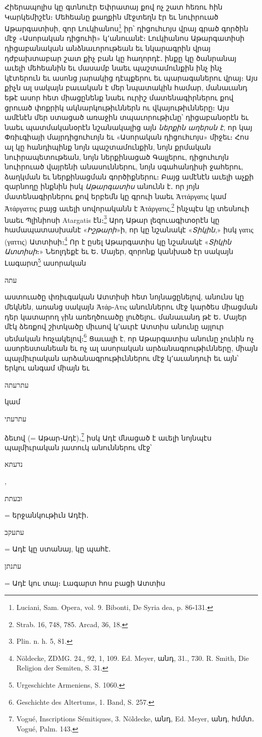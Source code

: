 \documentclass{article}
\begin{document}
{Հիերապոլիս կը գտնուէր Եփրատայ քով ոչ շատ հեռու հին Կարկեմիշէն։ Մեհեանը քաղքին մէջտեղն էր եւ նուիրուած Աթարգատիսի, զոր Լուկիանոս\footnote{Luciani, Sam. Opera, vol. 9. Bibonti, De Syria dea, p. 86֊131.} իր՝ դիցուհւոյս վրայ գրած գործին մէջ «Ասորական դիցուհի» կ՚անուանէ։ Լուկիանոս Աթարգատիսի դիցաբանական անձնաւորութեան եւ նկարագրին վրայ դժբախտաբար շատ քիչ բան կը հաղորդէ․ ինքը կը ծանրանայ աւելի մեհեանին եւ մասամբ նաեւ պաշտամունքին ինչ ինչ կէտերուն եւ ասոնց յարակից դէպքերու եւ պարագաներու վրայ։ Այս քիչն ալ սակայն բաւական է մեր նպատակին համար, մանաւանդ եթէ ասոր հետ միացընենք նաեւ ուրիշ մատենագիրներու քով ցրուած փոքրիկ ակնարկութիւններն ու վկայութիւնները։ Այս ամէնէն մեր ստացած առաջին տպաւորութիւնը՝ դիցաբանօրէն եւ նաեւ պատմականօրէն նշանակալից այն \emph{ներքին աղերսն է}, որ կայ Փռիւգիայի մայրդիցուհւոյն եւ «Ասորական դիցուհւոյս» միջեւ։ Հոս ալ կը հանդիպինք նոյն պաշտամունքին, նոյն քրմական նուիրապետութեան, նոյն ներքինացած Գալլերու, դիցուհւոյն նուիրուած վայրենի անասուններու, նոյն սգահանդիսի ջահերու, ձաղկման եւ ներքինացման գործիքներու։ Բայց ամէնէն աւելի աչքի զարնողը ինքնին իսկ \emph{Աթարգատիս} անունն է․ որ յոյն մատենագիրներու քով երբեմն կը գրուի նաեւ Ἀττάργατις կամ Ἀτάργαττις բայց աւելի սովորականն է Ἀτάργατις,\footnote{Strab. 16, 748, 785. Arcad, 36, 18.} ինչպէս կը տեսնուի նաեւ Պլինիոսի Atargatis էն։\footnote{Plin. n. h. 5, 81.} Արդ Աթար լեզուագիտօրէն կը համապատասխանէ «\emph{Իշթարի}»ի, որ կը նշանակէ «\emph{Տիկին},» իսկ γατις (γαττις) Ատտիսի։\footnote{Nöldecke, ZDMG. 24., 92, 1, 109. Ed. Meyer, անդ, 31., 730. R. Smith, Die Religion der Semiten, S. 31.} Որ է ըսել Աթարգատիս կը նշանակէ «\emph{Տիկին Ատտիսի}։» Նեոլդեքէ եւ Ե․ Մայեր, զորոնք կանխած էր սակայն Լագարտ\footnote{Urgeschichte Armeniens, S. 1060.} ասորական \begin{hebrewfont}עתה\end{hebrewfont} աստուածը փռիւգական Ատտիսի հետ նոյնացընելով, անունս կը մեկնեն, առանց սակայն Ἀτάρ֊Ατις անուններու մէջ կարծես միացման դեր կատարող γին առեղծուածը լուծելու․ մանաւանդ թէ Ե․ Մայեր մէկ ձեռքով շիտկածը միւսով կ՚աւրէ Ատտիս անունը այլուր սեմական հռչակելով։\footnote{Geschichte des Altertums, 1. Band, S. 257.} Ցաւալի է, որ Աթարգատիս անունը չունին ոչ ասորեստանեան եւ ոչ ալ ասորական արձանագրութիւնները, միայն պալմիւրական արձանագրութիւններու մէջ կ՚աւանդուի եւ այն՝ երկու անգամ միայն եւ \begin{hebrewfont}עתרעתה\end{hebrewfont} կամ \begin{hebrewfont}עתרעתי\end{hebrewfont} ձեւով (= Աթար֊Ադէ)․\footnote{Vogué, Inscriptions Sémitiques, 3. Nöldecke, անդ, Ed. Meyer, անդ, հմմտ․ Vogué, Palm. 143.} իսկ Ադէ մնացած է աւելի նոյնպէս պալմիւրական յատուկ անուններու մէջ՝ \begin{hebrewfont}נדעתא\end{hebrewfont}, \begin{hebrewfont}ובעתת\end{hebrewfont} = երջանկութիւն Ադէի․ \begin{hebrewfont}עתעקב\end{hebrewfont} = Ադէ կը ստանայ, կը պահէ․ \begin{hebrewfont}עתנתן\end{hebrewfont} = Ադէ կու տայ։ Լագարտ հոս բացի Ատտիս }
\end{document}
